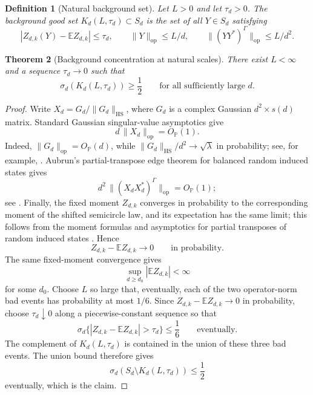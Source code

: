 \documentclass[11pt]{article}
\newtheorem{theorem}{Theorem}[section]
\newtheorem{definition}[theorem]{Definition}
\newcommand{\HS}{\mathrm{HS}}
\newcommand{\op}{\mathrm{op}}
\newcommand{\Prob}{\mathbb P}
\newcommand{\E}{\mathbb E}
\begin{document}
\begin{definition}[Natural background set]\label{def:background-set}
Let \(L>0\) and let \(\tau_d>0\).  The background good set
\(K_d(L,\tau_d)\subset S_d\) is the set of all \(Y\in S_d\) satisfying
\[
  |Z_{d,k}(Y)-\E Z_{d,k}|\le \tau_d,
  \qquad
  \|Y\|_{\op}\le L/d,
  \qquad
  \|(YY^*)^\Gamma\|_{\op}\le L/d^2 .
\]
\end{definition}

\begin{theorem}[Background concentration at natural scales]\label{thm:background-concentration}
There exist \(L<\infty\) and a sequence \(\tau_d\to0\) such that
\[
  \sigma_d(K_d(L,\tau_d))\ge \frac12
  \qquad\text{for all sufficiently large }d.
\]
\end{theorem}

\begin{proof}
Write \(X_d=G_d/\|G_d\|_{\HS}\), where \(G_d\) is a complex Gaussian
\(d^2\times s(d)\) matrix.  Standard Gaussian singular-value asymptotics give
\[
  d\,\|X_d\|_{\op}=O_{\Prob}(1).
\]
Indeed, \(\|G_d\|_{\op}=O_{\Prob}(d)\), while
\(\|G_d\|_{\HS}/d^2\to\sqrt{\lambda}\) in probability; see, for example,
\cite{DavidsonSzarek2001}.  Aubrun's
partial-transpose edge theorem for balanced random induced states gives
\[
  d^2\,\|(X_dX_d^*)^\Gamma\|_{\op}=O_{\Prob}(1);
\]
see \cite{Aubrun2012}.  Finally, the fixed moment \(Z_{d,k}\) converges in
probability to the corresponding moment of the shifted semicircle law, and
its expectation has the same limit; this follows from the moment formulas and
asymptotics for partial transposes of random induced states
\cite{Aubrun2012,FukudaSniady2013}.  Hence
\[
  Z_{d,k}-\E Z_{d,k}\longrightarrow0
  \qquad\text{in probability}.
\]
The same fixed-moment convergence gives
\begin{equation}\label{eq:expectation-bounded}
  \sup_{d\ge d_0}|\E Z_{d,k}|<\infty
\end{equation}
for some \(d_0\).
Choose \(L\) so large that, eventually, each of the two operator-norm bad
events has probability at most \(1/6\).  Since
\(Z_{d,k}-\E Z_{d,k}\to0\) in probability, choose \(\tau_d\downarrow0\) along a
piecewise-constant sequence so that
\[
  \sigma_d\{|Z_{d,k}-\E Z_{d,k}|>\tau_d\}\le\frac16
  \qquad\text{eventually}.
\]
The complement of \(K_d(L,\tau_d)\) is contained in the union of these three
bad events.  The union bound therefore gives
\[
  \sigma_d(S_d\setminus K_d(L,\tau_d))\le\frac12
\]
eventually, which is the claim.
\end{proof}
\end{document}
